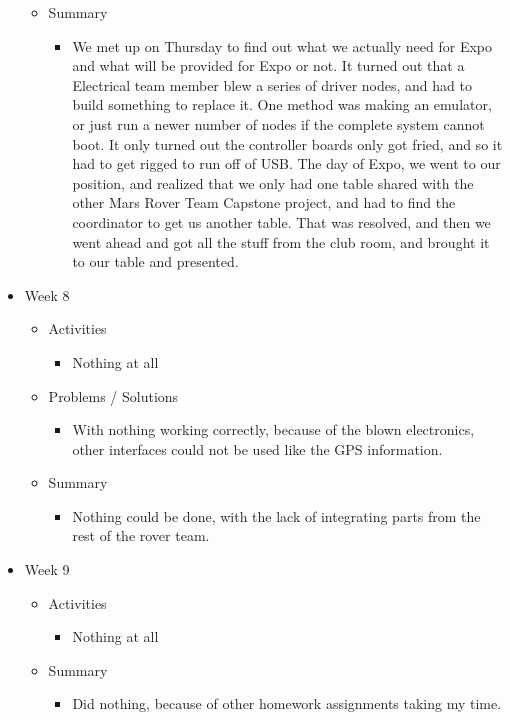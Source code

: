 \begin{itemize}
\begin{itemize}
\begin{itemize}
\end{itemize}
\item Summary
\begin{itemize}
\item We met up on Thursday to find out what we actually need for Expo and what will be provided for Expo or not. It turned out that a Electrical team member blew a series of driver nodes, and had to build something to replace it. One method was making an emulator, or just run a newer number of nodes if the complete system cannot boot. It only turned out the controller boards only got fried, and so it had to get rigged to run off of USB. The day of Expo, we went to our position, and realized that we only had one table shared with the other Mars Rover Team Capstone project, and had to find the coordinator to get us another table. That was resolved, and then we went ahead and got all the stuff from the club room, and brought it to our table and presented.
\end{itemize}
\end{itemize}
\item Week 8
\begin{itemize}
\item Activities
\begin{itemize}
\item Nothing at all
\end{itemize}
\item Problems / Solutions
\begin{itemize}
\item With nothing working correctly, because of the blown electronics, other interfaces could not be used like the GPS information.
\end{itemize}
\item Summary
\begin{itemize}
\item Nothing could be done, with the lack of integrating parts from the rest of the rover team.
\end{itemize}
\end{itemize}
\item Week 9
\begin{itemize}
\item Activities
\begin{itemize}
\item Nothing at all
\end{itemize}
\item Summary
\begin{itemize}
\item Did nothing, because of other homework assignments taking my time.

\end{itemize}
\end{itemize}
\end{itemize}
